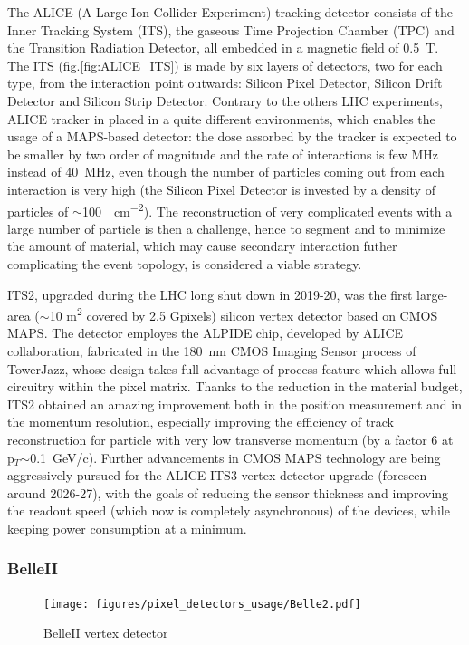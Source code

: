         The ALICE (A Large Ion Collider Experiment) tracking detector consists of the Inner Tracking System (ITS), the gaseous Time Projection Chamber (TPC) and the Transition Radiation Detector, all embedded in a magnetic field of \SI{0.5}{T}. The ITS (fig.\ref{fig:ALICE_ITS}) is made by six layers of detectors, two for each type, from the interaction point outwards: Silicon Pixel Detector, Silicon Drift Detector and Silicon Strip Detector.         
        Contrary to the others LHC experiments, ALICE tracker in placed in a quite different environments, which enables the usage of a MAPS-based detector: the dose assorbed by the tracker is expected to be smaller by two order of magnitude and the rate of interactions is few \si{MHz} instead of \SI{40}{MHz}, even though the number of particles coming out from each interaction is very high (the Silicon Pixel Detector is invested by a density of particles of $\sim$\SI{100}{\per cm\tothe{-2}}).  
        The reconstruction of very complicated events with a large number of particle is then a challenge, hence to segment and to minimize the amount of material, which may cause secondary interaction futher complicating the event topology, is considered a viable strategy. 
        
        ITS2, upgraded during the LHC long shut down in 2019-20, was the first large-area ($\sim$10 \si{m\squared} covered by 2.5 Gpixels) silicon vertex detector based on CMOS MAPS.
        The detector employes the ALPIDE chip, developed by ALICE collaboration, fabricated in the \SI{180}{nm} CMOS Imaging Sensor process of TowerJazz, whose design takes full advantage of process feature which allows full circuitry within the pixel matrix.
        Thanks to the reduction in the material budget, ITS2 obtained an amazing improvement both in the position measurement and in the momentum resolution, especially improving the efficiency of track reconstruction for particle with very low transverse momentum (by a factor 6 at p$_{T}$$\sim$\SI{0.1}{GeV/c}). Further advancements in CMOS MAPS technology are being aggressively pursued for the ALICE ITS3 vertex detector upgrade (foreseen around 2026-27), with the goals of reducing the sensor thickness and improving the readout speed (which now is completely asynchronous) of the devices, while keeping power consumption at a minimum.

        \subsubsection{BelleII}
        \begin{figure} 
            \centering
            \texttt{[image: figures/pixel\_detectors\_usage/Belle2.pdf]}      
            \caption{BelleII vertex detector}
            \label{fig:Belle2_Vertex}
       \end{figure}

